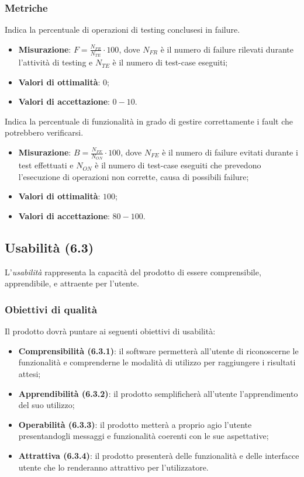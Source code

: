 \subsubsection{Metriche}
\label{denFailure}
Indica la percentuale di operazioni di testing conclusesi in failure.
\begin{itemize}
\item \textbf{Misurazione}: $F=\frac{N_{FR}}{N_{TE}} \cdot 100$, dove $N_{FR}$ è il numero di failure rilevati durante l'attività di testing e $N_{TE}$ è il numero di test-case eseguiti;
\item \textbf{Valori di ottimalità}: $0$;
\item \textbf{Valori di accettazione}: $0 - 10$.
\end{itemize}
\label{bloccoOpNnCorr}
Indica la percentuale di funzionalità in grado di gestire correttamente i fault che potrebbero verificarsi.
\begin{itemize}
\item \textbf{Misurazione}: $B=\frac{N_{FE}}{N_{ON}} \cdot 100$, dove $N_{FE}$ è il numero di failure evitati durante i test effettuati e $N_{ON}$ è il numero di test-case eseguiti che prevedono l'esecuzione di operazioni non corrette, causa di possibili failure;
\item \textbf{Valori di ottimalità}: $100$;
\item \textbf{Valori di accettazione}: $80 - 100$.
\end{itemize}
\subsection{Usabilità (6.3)}
\label{usabilita}
L'\emph{usabilità} rappresenta la capacità del prodotto di essere comprensibile, apprendibile, e attraente per l'utente.
\subsubsection{Obiettivi di qualità}
Il prodotto dovrà puntare ai seguenti obiettivi di usabilità:
\begin{itemize}
\item \textbf{Comprensibilità (6.3.1)}: il software permetterà all'utente di riconoscerne le funzionalità e comprenderne le modalità di utilizzo per raggiungere i risultati attesi;
\item \textbf{Apprendibilità (6.3.2)}: il prodotto semplificherà all'utente l'apprendimento del suo utilizzo;
\item \textbf{Operabilità (6.3.3)}: il prodotto metterà a proprio agio l'utente presentandogli messaggi e funzionalità coerenti con le sue aspettative;
\item \textbf{Attrattiva (6.3.4)}: il prodotto presenterà delle funzionalità e delle interfacce utente che lo renderanno attrattivo per l'utilizzatore.
\end{itemize}
